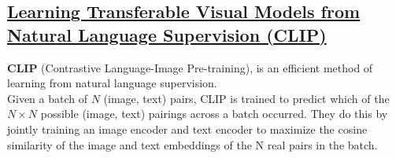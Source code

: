 \documentclass[12pt]{amsart}
\begin{document}
\newpage

\subsection{\href{https://arxiv.org/pdf/2103.00020.pdf}{Learning Transferable Visual Models from Natural Language Supervision (CLIP)}}

\begin{approach*} \textbf{CLIP} (Contrastive Language-Image Pre-training), is an efficient method of learning from natural language supervision. \\

Given a batch of $N$ (image, text) pairs, CLIP is trained to predict which of the $N \times N$ possible (image, text) pairings across a batch occurred. They do this by jointly training an image encoder and text encoder to maximize the cosine similarity of the image and text embeddings of the N real pairs in the batch.
\end{approach*}
\end{document}
